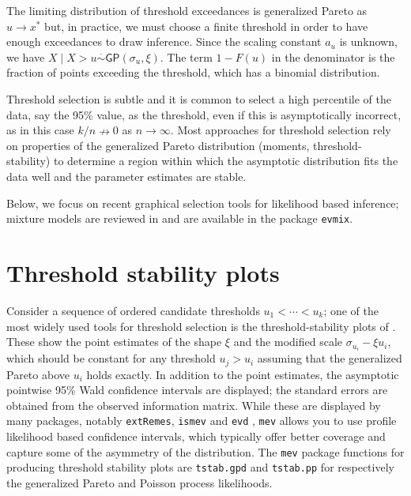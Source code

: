 \documentclass[]{book}
\begin{document}
The limiting distribution of threshold exceedances is generalized Pareto as \(u \to x^*\) but, in practice, we must choose a finite threshold in order to have enough exceedances to draw inference. Since the scaling constant \(a_u\) is unknown, we have \(X \mid X > u \stackrel{\cdot}{\sim} \mathsf{GP}(\sigma_u, \xi)\). The term \(1-F(u)\) in the denominator is the fraction of points exceeding the threshold, which has a binomial distribution.

Threshold selection is subtle and it is common to select a high percentile of the data, say the
95\% value, as the threshold, even if this is asymptotically incorrect, as in this case \(k/n \nrightarrow 0\) as \(n \to \infty\). Most approaches for threshold selection rely on properties of the
generalized Pareto distribution (moments, threshold-stability) to determine a region within which the asymptotic distribution fits the data well and the parameter estimates are stable.

Below, we focus on recent graphical selection tools for likelihood based inference; mixture models are reviewed in \citet{Scarrott:2012} and are available in the package \texttt{evmix}.

\hypertarget{threshold-stability-plots}{%
\section{Threshold stability plots}\label{threshold-stability-plots}}

Consider a sequence of ordered candidate thresholds \(u_1 < \cdots < u_k\); one of the most widely used tools for threshold selection is the threshold-stability plots of \citet{Davison:1990}. These show the point estimates of the shape \(\xi\) and the modified scale \(\sigma_{u_i}-\xi u_i\), which should be constant for any threshold \(u_{j} >u_i\) assuming that the generalized Pareto above \(u_i\) holds exactly. In addition to the point estimates, the asymptotic pointwise 95\% Wald confidence intervals are displayed; the standard errors are obtained from the observed information matrix. While these are displayed by many packages, notably \texttt{extRemes}, \texttt{ismev} and \texttt{evd} , \texttt{mev} allows you to use profile likelihood based confidence intervals, which typically offer better coverage and capture some of the asymmetry of the distribution. The \texttt{mev} package functions for producing threshold stability plots are \texttt{tstab.gpd} and \texttt{tstab.pp} for respectively the generalized Pareto and Poisson process likelihoods.
\end{document}
